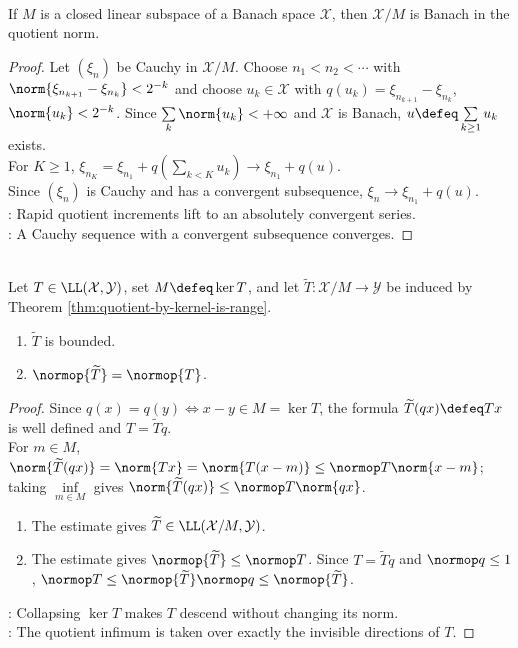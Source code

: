 \begin{theorem} \label{thm:banach-quotient-space} \\
If $M$ is a closed linear subspace of a Banach space $\mathcal{X}$, then $\mathcal{X}/M$ is Banach in the quotient norm.
\begin{proof}
Let $(\xi_n)$ be Cauchy in $\mathcal X/M$. Choose $n_1<n_2<\cdots$ with $\norm{\xi_{n_{k+1}}-\xi_{n_k}}<2^{-k}$ and choose $u_k\in\mathcal X$ with $q(u_k)=\xi_{n_{k+1}}-\xi_{n_k}$, $\norm{u_k}<2^{-k}$. Since $\sum\limits_k\norm{u_k}<+\infty$ and $\mathcal X$ is Banach, $u\defeq\sum\limits_{k\geq1}u_k$ exists.\\
For $K\geq1$, $\xi_{n_K}=\xi_{n_1}+q(\sum\limits_{k<K}u_k)\to\xi_{n_1}+q(u)$.\\
Since $(\xi_n)$ is Cauchy and has a convergent subsequence, $\xi_n\to\xi_{n_1}+q(u)$.\\
: Rapid quotient increments lift to an absolutely convergent series.\\
: A Cauchy sequence with a convergent subsequence converges.
\end{proof}
\end{theorem}

\begin{proposition} \label{prop:kernel-quotient-factor-operator-norm} \\
Let $T\in\LL(\mathcal{X},\mathcal{Y})$, set $M\defeq\ker T$, and let $\widetilde{T}:\mathcal{X}/M\to\mathcal{Y}$ be induced by Theorem \ref{thm:quotient-by-kernel-is-range}.
\begin{enumerate}[label=(\roman*)]
\setlength{\itemsep}{0pt}
\item $\widetilde{T}$ is bounded.
\item $\normop{\widetilde{T}}=\normop{T}$.
\end{enumerate}
\begin{proof}
Since $q(x)=q(y)\iff x-y\in M=\ker T$, the formula $\widetilde T(qx)\defeq Tx$ is well defined and $T=\widetilde Tq$.\\
For $m\in M$, $\norm{\widetilde T(qx)}=\norm{Tx}=\norm{T(x-m)}\leq\normop T\norm{x-m}$; taking $\inf\limits_{m\in M}$ gives $\norm{\widetilde T(qx)}\leq\normop T\norm{qx}$.
\begin{enumerate}[label=(\roman*)]
\setlength{\itemsep}{0pt}
\item The estimate gives $\widetilde T\in\LL(\mathcal X/M,\mathcal Y)$.
\item The estimate gives $\normop{\widetilde T}\leq\normop T$. Since $T=\widetilde Tq$ and $\normop q\leq1$, $\normop T\leq\normop{\widetilde T}\normop q\leq\normop{\widetilde T}$.
\end{enumerate}
: Collapsing $\ker T$ makes $T$ descend without changing its norm.\\
: The quotient infimum is taken over exactly the invisible directions of $T$.
\end{proof}
\end{proposition}

